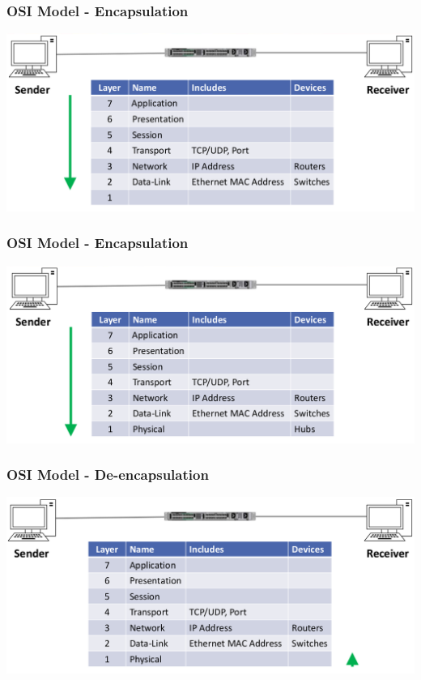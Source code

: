 \documentclass[pdflatex,compress]{beamer}
\begin{document}
\begin{frame}
	\frametitle{OSI Model - Encapsulation}
	\begin{center}
		\includegraphics[width=\linewidth]{img/img08}
	\end{center}
\end{frame}

\begin{frame}
	\frametitle{OSI Model - Encapsulation}
	\begin{center}
		\includegraphics[width=\linewidth]{img/img09}
	\end{center}
\end{frame}

\begin{frame}
	\frametitle{OSI Model - De-encapsulation}
	\begin{center}
		\includegraphics[width=\linewidth]{img/img10}
	\end{center}
\end{frame}
\end{document}
